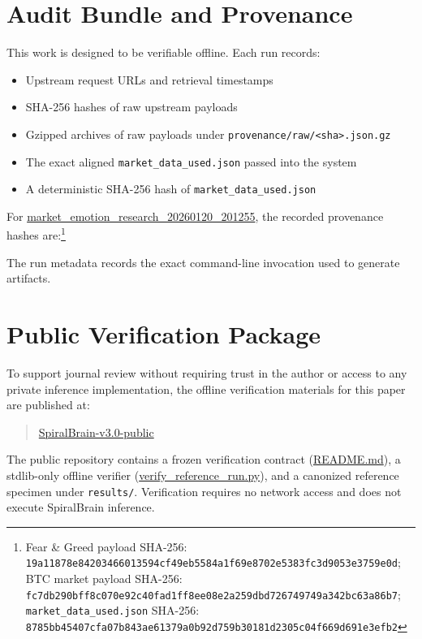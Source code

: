 \documentclass[12pt,a4paper]{report}
\begin{document}
\section{Audit Bundle and Provenance}

This work is designed to be verifiable offline. Each run records:

\begin{itemize}
	\item Upstream request URLs and retrieval timestamps
	\item SHA-256 hashes of raw upstream payloads
	\item Gzipped archives of raw payloads under \texttt{provenance/raw/<sha>.json.gz}
	\item The exact aligned \texttt{market\_data\_used.json} passed into the system
	\item A deterministic SHA-256 hash of \texttt{market\_data\_used.json}
\end{itemize}

For \href{https://github.com/jhcragin/SpiralBrain-v3.0-public/tree/main/market_emotion_risk_posture/results}{market_emotion_research_20260120_201255}, the recorded provenance hashes are:\footnote{Fear \& Greed payload SHA-256: \texttt{19a11878e84203466013594cf49eb5584a1f69e8702e5383fc3d9053e3759e0d}; BTC market payload SHA-256: \texttt{fc7db290bff8c070e92c40fad1ff8ee08e2a259dbd726749749a342bc63a86b7}; \texttt{market\_data\_used.json} SHA-256: \texttt{8785bb45407cfa07b843ae61379a0b92d759b30181d2305c04f669d691e3efb2}}

The run metadata records the exact command-line invocation used to generate artifacts.

\section{Public Verification Package}

To support journal review without requiring trust in the author or access to any private inference implementation, the offline verification materials for this paper are published at:

\begin{quote}
\href{https://github.com/jhcragin/SpiralBrain-v3.0-public}{SpiralBrain-v3.0-public}
\end{quote}

The public repository contains a frozen verification contract (\href{https://github.com/jhcragin/SpiralBrain-v3.0-public/blob/main/README.md}{README.md}), a stdlib-only offline verifier (\href{https://github.com/jhcragin/SpiralBrain-v3.0-public/blob/main/market_emotion_risk_posture/verify_reference_run.py}{verify_reference_run.py}), and a canonized reference specimen under \texttt{results/}. Verification requires no network access and does not execute SpiralBrain inference.
\end{document}
